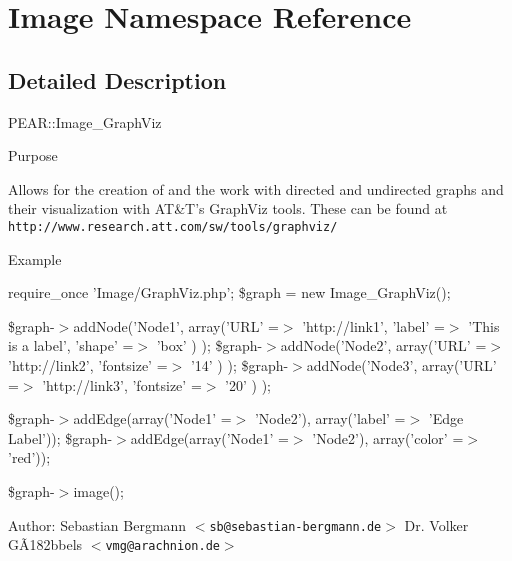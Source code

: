 \section{Image Namespace Reference}
\label{namespaceImage}




\subsection{Detailed Description}
PEAR::Image\_\-Graph\-Viz

Purpose

Allows for the creation of and the work with directed and undirected graphs and their visualization with AT\&T's Graph\-Viz tools. These can be found at {\tt http://www.research.att.com/sw/tools/graphviz/}

Example

require\_\-once 'Image/Graph\-Viz.php'; \$graph = new Image\_\-Graph\-Viz();

\$graph-$>$add\-Node('Node1', array('URL' =$>$ 'http://link1', 'label' =$>$ 'This is a label', 'shape' =$>$ 'box' ) ); \$graph-$>$add\-Node('Node2', array('URL' =$>$ 'http://link2', 'fontsize' =$>$ '14' ) ); \$graph-$>$add\-Node('Node3', array('URL' =$>$ 'http://link3', 'fontsize' =$>$ '20' ) );

\$graph-$>$add\-Edge(array('Node1' =$>$ 'Node2'), array('label' =$>$ 'Edge Label')); \$graph-$>$add\-Edge(array('Node1' =$>$ 'Node2'), array('color' =$>$ 'red'));

\$graph-$>$image();

\begin{Desc}
\item[Author:]Sebastian Bergmann $<${\tt sb@sebastian-bergmann.de}$>$ Dr. Volker G\~{A}182bbels $<${\tt vmg@arachnion.de}$>$ \end{Desc}


